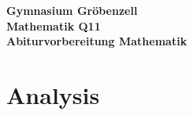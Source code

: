 \documentclass[a4paper]{report}
\begin{document}
\onehalfspacing
\begin{titlepage}

\begin{center}
\huge \textbf{Gymnasium Gröbenzell}
\vspace{0.2cm}\\
\Large \textbf{ Mathematik Q11}
\vspace{1cm}\\
\LARGE \textbf{Abiturvorbereitung Mathematik}
\vspace{1cm}\\
\end{center}
\end{titlepage}
\tableofcontents
\newpage
\chapter{Analysis}
\end{document}
